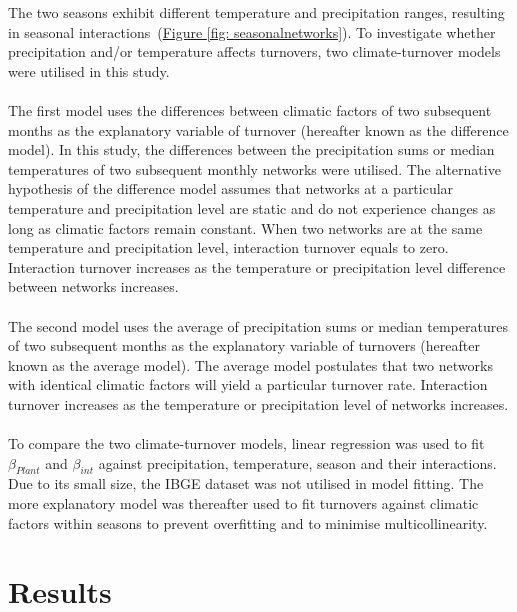 \documentclass[11pt]{article}
\begin{document}
The two seasons exhibit different temperature and precipitation ranges, resulting in seasonal interactions~(\hyperref[fig: seasonalnetworks]{Figure \ref{fig: seasonalnetworks}}). To investigate whether precipitation and/or temperature affects turnovers, two climate-turnover models were utilised in this study. \\
\\
The first model uses the differences between climatic factors of two subsequent months as the explanatory variable of turnover (hereafter known as the difference model). In this study, the differences between the precipitation sums or median temperatures of two subsequent monthly networks were utilised. The alternative hypothesis of the difference model assumes that networks at a particular temperature and precipitation level are static and do not experience changes as long as climatic factors remain constant. When two networks are at the same temperature and precipitation level, interaction turnover equals to zero. Interaction turnover increases as the temperature or precipitation level difference between networks increases.\\
\\
The second model uses the average of precipitation sums or median temperatures of two subsequent months as the explanatory variable of turnovers (hereafter known as the average model). The average model postulates that two networks with identical climatic factors will yield a particular turnover rate. Interaction turnover increases as the temperature or precipitation level of networks increases.\\
\\
To compare the two climate-turnover models, linear regression was used to fit $\beta_{Plant}$ and $\beta_{int}$ against precipitation, temperature, season and their interactions. Due to its small size, the IBGE dataset was not utilised in model fitting. The more explanatory model was thereafter used to fit turnovers against climatic factors within seasons to prevent overfitting and to minimise multicollinearity.

\newpage
\section{Results}
\label{sec: Results} %
\end{document}
